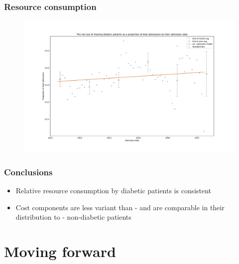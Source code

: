 \documentclass{beamer}
\begin{document}
\begin{frame}
    \frametitle{Resource consumption}

    \begin{figure}
    \includegraphics[width=\linewidth]{./img/diabetic_netcost_proportions.pdf}
    \end{figure}
\end{frame}

\begin{frame}
    \frametitle{Conclusions}

    \begin{itemize}
        \item Relative resource consumption by diabetic patients is consistent
        \item Cost components are less variant than \-- and are comparable in
            their distribution to \-- non-diabetic patients
    \end{itemize}
\end{frame}

\section{Moving forward}
\end{document}

